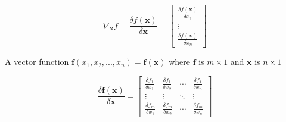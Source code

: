 \documentclass[fleqn]{article}
\begin{document}
	\begin{equation*}
		\nabla_{\mathbf{x}}f = \frac{\delta f(\mathbf{x})}{\delta\mathbf{x}} = \begin{bmatrix}
			\frac{\delta f(\mathbf{x})}{\delta{x_1}} \\
			\vdots \\
			\frac{\delta f(\mathbf{x})}{\delta{x_n}}
		\end{bmatrix}
	\end{equation*}
	
	A vector function $\mathbf{f}(x_1,x_2,...,x_n) = \mathbf{f}(\mathbf{x})$ where $\mathbf{f}$ is $m \times 1$ and $\mathbf{x}$ is $n \times 1$
	
	\begin{equation*}
		\frac{\delta\mathbf{f}(\mathbf{x})}{\delta\mathbf{x}} = \begin{bmatrix}
			\frac{\delta{f_1}}{\delta{x_1}} & \frac{\delta{f_1}}{\delta{x_2}} & \cdots & \frac{\delta{f_1}}{\delta{x_n}} \\
			\vdots & \vdots & \ddots & \vdots \\
			\frac{\delta{f_m}}{\delta{x_1}} & \frac{\delta{f_m}}{\delta{x_2}} & \cdots & \frac{\delta{f_m}}{\delta{x_n}}
		\end{bmatrix}
	\end{equation*}
	
	
\end{document}
